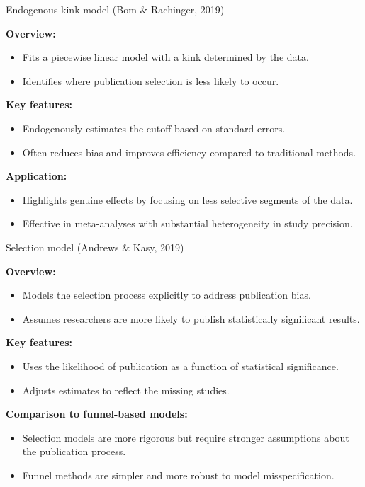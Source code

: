 \documentclass{beamer} %
\begin{document}
\begin{frame}{Endogenous kink model (Bom \& Rachinger, 2019)}

\textbf{Overview:}
\begin{itemize}
    \item Fits a piecewise linear model with a kink determined by the data.
    \item Identifies where publication selection is less likely to occur.
\end{itemize}

\bigskip

\textbf{Key features:}
\begin{itemize}
    \item Endogenously estimates the cutoff based on standard errors.
    \item Often reduces bias and improves efficiency compared to traditional methods.
\end{itemize}

\bigskip

\textbf{Application:}
\begin{itemize}
    \item Highlights genuine effects by focusing on less selective segments of the data.
    \item Effective in meta-analyses with substantial heterogeneity in study precision.
\end{itemize}

\end{frame}


\begin{frame}{Selection model (Andrews \& Kasy, 2019)}

\textbf{Overview:}
\begin{itemize}
    \item Models the selection process explicitly to address publication bias.
    \item Assumes researchers are more likely to publish statistically significant results.
\end{itemize}

\bigskip

\textbf{Key features:}
\begin{itemize}
    \item Uses the likelihood of publication as a function of statistical significance.
    \item Adjusts estimates to reflect the missing studies.
\end{itemize}

\bigskip

\textbf{Comparison to funnel-based models:}
\begin{itemize}
    \item Selection models are more rigorous but require stronger assumptions about the publication process.
    \item Funnel methods are simpler and more robust to model misspecification.
\end{itemize}

\end{frame}
\end{document}
